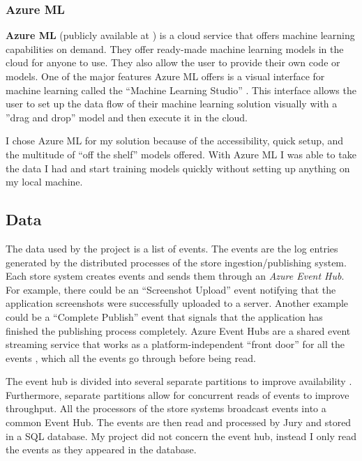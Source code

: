 \subsubsection{Azure ML}

\textbf{Azure ML} (publicly available at \cite{azuremlpub}) is a cloud service that offers machine learning capabilities on demand. 
They offer ready-made machine learning models in the cloud for anyone to use.
They also allow the user to provide their own code or models.
One of the major features Azure ML offers is a visual interface for machine learning called the ``Machine Learning Studio'' \cite{azureml}.
This interface allows the user to set up the data flow of their machine learning solution visually with a ''drag and drop'' model and then execute it in the cloud.

I chose Azure ML for my solution because of the accessibility, quick setup, and the multitude of ``off the shelf'' models offered.
With Azure ML I was able to take the data I had and start training models quickly without setting up anything on my local machine.

\subsection{Data}
The data used by the project is a list of events. The events are the log entries generated by the distributed processes of the store ingestion/publishing system. Each store system creates events and sends them through an \textit{Azure Event Hub}. 
For example, there could be an ``Screenshot Upload'' event notifying that the application screenshots were successfully uploaded to a server.
Another example could be a ``Complete Publish'' event that signals that the application has finished the publishing process completely.
Azure Event Hubs are a shared event streaming service that works as a platform-independent ``front door'' for all the events \cite{eventhubs}, 
which all the events go through before being read.

The event hub is divided into several separate partitions to improve availability \cite{eventhubavail}.
Furthermore, separate partitions allow for concurrent reads of events to improve throughput.
All the processors of the store systems broadcast events into a common Event Hub.
The events are then read and processed by Jury and stored in a SQL database.
My project did not concern the event hub, instead I only read the events as they appeared in the database.


